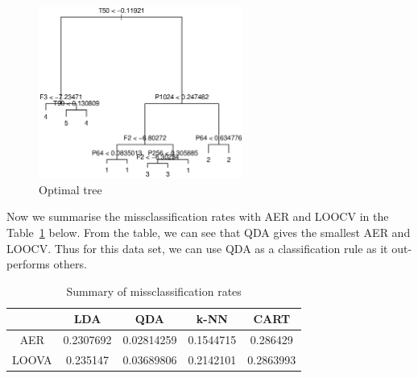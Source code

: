 \documentclass{article}
\begin{document}
\begin{enumerate}[leftmargin = 0 em, label = \arabic*., font = \bfseries]
\begin{figure}[!htb]
	\centering
	\includegraphics[width = 0.6\textwidth]{Treeopt.eps}
	\caption{Optimal tree}
	\label{tree_opt}
\end{figure}

Now we summarise the missclassification rates with AER and LOOCV in the Table~\ref{miscr} below. From the table, we can see that QDA gives the smallest AER and LOOCV. Thus for this data set, we can use QDA as a classification rule as it out-performs others.

\begin{table}
\caption{Summary of missclassification rates}
\label{miscr}
\begin{center}
\begin{tabular}{ccccc}
\toprule
  & LDA & QDA & k-NN & CART \\
  \midrule
AER & 0.2307692 & 0.02814259 & 0.1544715 & 0.286429\\
LOOVA & 0.235147 & 0.03689806 & 0.2142101 & 0.2863993\\
\bottomrule
\end{tabular}\end{center}
\end{table}



\end{enumerate}
\end{document}
